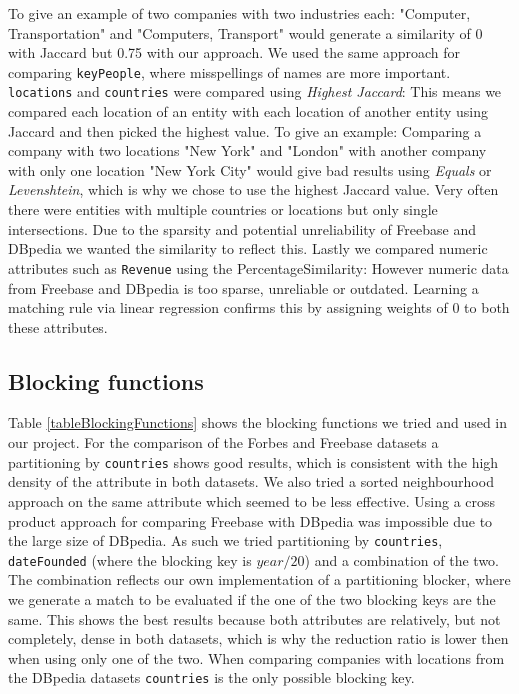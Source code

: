 To give an example of two companies with two industries each: "Computer, Transportation" and "Computers, Transport" would generate a similarity of 0 with Jaccard but 0.75 with our approach. We used the same approach for comparing \texttt{keyPeople}, where misspellings of names are more important. \texttt{locations} and \texttt{countries} were compared using \textit{Highest Jaccard}: This means we compared each location of an entity with each location of another entity using Jaccard and then picked the highest value. To give an example: Comparing a company with two locations "New York" and "London" with another company with only one location "New York City" would give bad results using \textit{Equals} or \textit{Levenshtein}, which is why we chose to use the highest Jaccard value. Very often there were entities with multiple countries or locations but only single intersections. Due to the sparsity and potential unreliability of Freebase and DBpedia we wanted the similarity to reflect this. Lastly we compared numeric attributes such as \texttt{Revenue} using the PercentageSimilarity: However numeric data from Freebase and DBpedia is too sparse, unreliable or outdated. Learning a matching rule via linear regression confirms this by assigning weights of 0 to both these attributes.





	
	
\subsection{Blocking functions}
Table \ref{tableBlockingFunctions} shows the blocking functions we tried and used in our project. For the comparison of the Forbes and Freebase datasets a partitioning by \texttt{countries} shows good results, which is consistent with the high density of the attribute in both datasets. We also tried a sorted neighbourhood approach on the same attribute which seemed to be less effective. Using a cross product approach for comparing Freebase with DBpedia was impossible due to the large size of DBpedia. As such we tried partitioning by \texttt{countries}, \texttt{dateFounded} (where the blocking key is $year/20$) and a combination of the two. The combination reflects our own implementation of a partitioning blocker, where we generate a match to be evaluated if the one of the two blocking keys are the same. This shows the best results because both attributes are relatively, but not completely, dense in both datasets, which is why the reduction ratio is lower then when using only one of the two. When comparing companies with locations from the DBpedia datasets \texttt{countries} is the only possible blocking key. 

